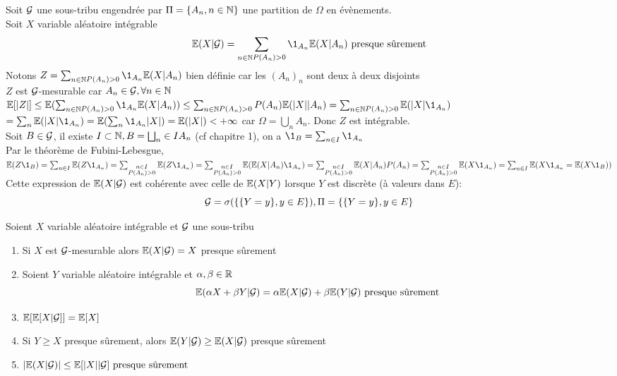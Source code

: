\documentclass[]{report}
\begin{document}
    \begin{ex}{}{}
        Soit $\mathcal{G}$ une sous-tribu engendrée par $\Pi=\{A_n,n\in \mathbb{N}\}$ une partition de $\Omega$ en évènements.\\
        Soit $X$ variable aléatoire intégrable
        \[\Ea(X|\Gr)=\sum_{\substack{n\in \N}\\ P(A_n)>0}\1_{A_n}\Ea(X|A_n)\text{ presque sûrement}\]
        Notons $Z=\sum_{\substack{n\in \N}\\ P(A_n)>0}\1_{A_n}\Ea(X|A_n)$ bien définie car les $(A_n)_n$ sont deux à deux disjoints\\
        $Z$ est $\mathcal{G}$-mesurable car $A_n\in \mathcal{G},\forall n\in \mathbb{N}$\\
        $\Ea[|Z|]\le \Ea(\sum_{\substack{n\in \N}\\ P(A_n)>0}\1_{A_n}\Ea(X|A_n))\le \sum_{\substack{n\in \N}\\ P(A_n)>0}P(A_n)\Ea(|X|| A_n)=\sum_{\substack{n\in \N}\\ P(A_n)>0}\Ea(|X|\1_{A_n})$\\
        $=\sum_{n} \Ea(|X|\1_{A_n})=\Ea(\sum_n \1_{A_n}|X|)=\Ea(|X|)<+\infty$ car $\Omega=\bigcup_n A_n$. Donc $Z$ est intégrable.\\
        Soit $B\in \mathcal{G}$, il existe $I\subset \mathbb{N},B=\bigsqcup_n\in I A_n$ (cf chapitre 1), on a $\1_B=\sum_{n\in I}\1_{A_n}$\\
        Par le théorème de Fubini-Lebesgue,\\
        $\Ea (Z\1_B)=\sum_{n\in I}\Ea(Z\1_{A_n})=\sum_{\substack{n\in I\\P(A_n)>0}}\Ea(Z\1_{A_n})=\sum_{\substack{n\in I\\P(A_n)>0}}\Ea(\Ea(X|A_n)\1_{A_n})=\sum_{\substack{n\in I\\P(A_n)>0}}\Ea(X|A_n)P(A_n)=\sum_{\substack{n\in I\\P(A_n)>0}}\Ea(X\1_{A_n})=\sum_{\substack{n\in I}}\Ea(X\1_{A_n}=\Ea(X\1_B))$\\
        Cette expression de $\mathbb{E}(X|\mathcal{G})$ est cohérente avec celle de $\mathbb{E}(X|Y)$ lorsque $Y$ est discrète (à valeurs dans $E$):
        \[\mathcal{G}=\sigma(\{\{Y=y\},y\in E\}),\Pi=\{\{Y=y\},y\in E\}\]
    \end{ex}

    \begin{prop}{}{}
        Soient $X$ variable aléatoire intégrable et $\mathcal{G}$ une sous-tribu
        \begin{enumerate}
            \item Si $X$ est $\mathcal{G}$-mesurable alors $\mathbb{E}(X|\mathcal{G})=X$ presque sûrement
            \item Soient $Y$ variable aléatoire intégrable et $\alpha,\beta\in \mathbb{R}$
            \[\mathbb{E}(\alpha X+\beta Y|\mathcal{G})=\alpha\mathbb{E}(X|\mathcal{G})+\beta\mathbb{E}(Y|\mathcal{G})\text{ presque sûrement}\]
            \item $\mathbb{E}[\mathbb{E}[X|\mathcal{G}]]=\mathbb{E}[X]$
            \item Si $Y\ge X$ presque sûrement, alors $\mathbb{E}(Y|\mathcal{G})\ge \mathbb{E}(X|\mathcal{G})$ presque sûrement
            \item $\left|\mathbb{E}(X|\mathcal{G})\right|\le \mathbb{E}[|X||\mathcal{G}]\text{ presque sûrement}$
        \end{enumerate}
    \end{prop}
\end{document}
